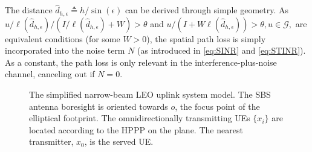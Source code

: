 \documentclass[lettersize,journal]{IEEEtran}
\begin{document}
The distance $\hat{d}_{h,\epsilon} \triangleq h/\sin(\epsilon)$ can be derived through simple geometry. As $u/\ell(\hat{d}_{h,\epsilon})/(I/\ell(\hat{d}_{h,\epsilon})+W) > \theta $ and $u /(I+W \ell(\hat{d}_{h,\epsilon}))> \theta, u \in \mathcal{G},$ are equivalent conditions (for some $W>0$), the spatial path loss is simply incorporated into the noise term $N$ (as introduced in \eqref{eq:SINR} and \eqref{eq:STINR}). As a constant, the path loss is only relevant in the interference-plus-noise channel, canceling out if $N=0$.
\begin{figure}[h]%
  \centering
  \qquad
  \caption{The simplified narrow-beam LEO uplink system model. The SBS antenna boresight is oriented towards $\textit{o}$, the focus point of the elliptical footprint. The omnidirectionally transmitting UEs $\{x_i\}$ are located according to the HPPP on the plane. The nearest transmitter, $x_0$, is the served UE.}
\end{figure}
\end{document}
